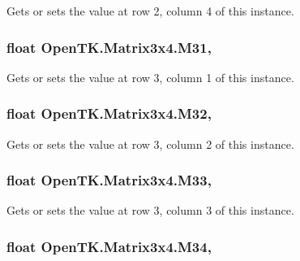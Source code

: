 Gets or sets the value at row 2, column 4 of this instance. 

\hypertarget{struct_open_t_k_1_1_matrix3x4_a7956c211db10dadfd5bf1d58f9e0581b}{
\subsubsection[{M31}]{\setlength{\rightskip}{0pt plus 5cm}float Open\-T\-K.\-Matrix3x4.\-M31\hspace{0.3cm}{\ttfamily [get]}, {\ttfamily [set]}}}\label{struct_open_t_k_1_1_matrix3x4_a7956c211db10dadfd5bf1d58f9e0581b}


Gets or sets the value at row 3, column 1 of this instance. 

\hypertarget{struct_open_t_k_1_1_matrix3x4_ada71b6583156e27adb436282a5664500}{
\subsubsection[{M32}]{\setlength{\rightskip}{0pt plus 5cm}float Open\-T\-K.\-Matrix3x4.\-M32\hspace{0.3cm}{\ttfamily [get]}, {\ttfamily [set]}}}\label{struct_open_t_k_1_1_matrix3x4_ada71b6583156e27adb436282a5664500}


Gets or sets the value at row 3, column 2 of this instance. 

\hypertarget{struct_open_t_k_1_1_matrix3x4_a094b5cb01964e84b8969065e4d470f27}{
\subsubsection[{M33}]{\setlength{\rightskip}{0pt plus 5cm}float Open\-T\-K.\-Matrix3x4.\-M33\hspace{0.3cm}{\ttfamily [get]}, {\ttfamily [set]}}}\label{struct_open_t_k_1_1_matrix3x4_a094b5cb01964e84b8969065e4d470f27}


Gets or sets the value at row 3, column 3 of this instance. 

\hypertarget{struct_open_t_k_1_1_matrix3x4_a9d8155b17cbf56237bdae3bb825f924e}{
\subsubsection[{M34}]{\setlength{\rightskip}{0pt plus 5cm}float Open\-T\-K.\-Matrix3x4.\-M34\hspace{0.3cm}{\ttfamily [get]}, {\ttfamily [set]}}}\label{struct_open_t_k_1_1_matrix3x4_a9d8155b17cbf56237bdae3bb825f924e}


